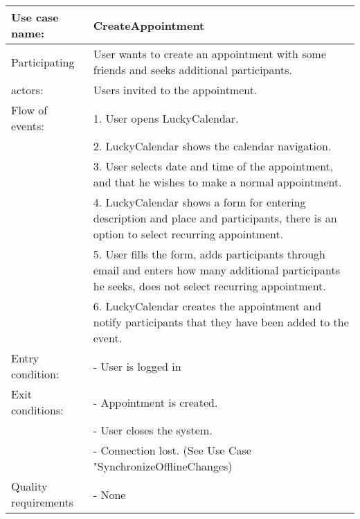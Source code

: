 {\tabulinesep=1.2mm
\begin{tabu}{ | p{3cm} | p{13cm} |}
    \hline
    Use case name: 			& 		CreateAppointment\\ \hline
    Participating  			& 		User wants to create an appointment with some friends and seeks additional participants. \\
    actors:					&		Users invited to the appointment.\\ \hline
    Flow of events: 		& 		1. User opens LuckyCalendar. \\
							&		2. LuckyCalendar shows the calendar navigation.\\
							&		3. User selects date and time of the appointment, and that he wishes to make a normal appointment.\\
							&		4. LuckyCalendar shows a form for entering description and place and participants, there is an option to select recurring appointment.\\
							&		5. User fills the form, adds participants through email and enters how many additional participants he seeks, does not select recurring appointment.\\
							&		6. LuckyCalendar creates the appointment and notify participants that they have been added to the event.\\ \hline
    Entry condition: 		& 		- User is logged in  \\\hline
	Exit conditions: 		&		- Appointment is created.\\
							&		- User closes the system.\\
							&		- Connection lost. (See Use Case "SynchronizeOfflineChanges)\\\hline
	Quality requirements	&	 	- None \\\hline
\end{tabu}
}
